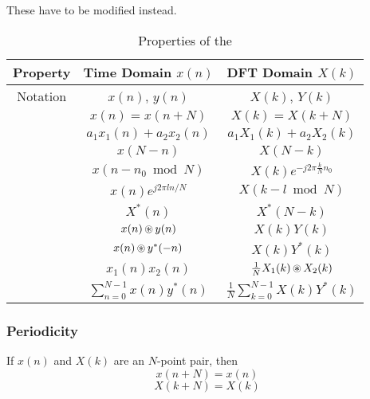 These have to be modified instead.
\begin{table}[h!]
  \centering
  \begin{tabular}{ccc}
    \toprule
    Property & Time Domain $x(n)$ & DFT Domain $X(k)$ \\
    \midrule
    Notation & $x(n)$, $y(n)$ & $X(k)$, $Y(k)$ \\
    \nameref{subsubsec:DFT_Properties-Periodicity} & $x(n) = x(n+N)$ & $X(k) = X(k+N)$ \\
    \nameref{subsubsec:DFT_Properties-Linearity} & $a_{1}x_{1}(n) + a_{2}x_{2}(n)$ & $a_{1}X_{1}(k) + a_{2}X_{2}(k)$ \\
    \nameref{subsubsec:DFT_Properties-Time_Reversal} & $x(N-n)$ & $X(N-k)$ \\
    \nameref{subsubsec:DFT_Properties-Circular_Time_Shifting} & $x(n - n_{0} \bmod N)$ & $X(k) e^{-j 2\pi \frac{k}{N} n_{0}} $ \\
    \nameref{subsubsec:DFT_Properties-Circular_Frequency_Shift} & $x(n)e^{j2\pi l n/N}$ & $X(k-l \bmod N)$ \\
    \nameref{subsubsec:DFT_Properties-Complex_Conjugate} & $X^{*}(n)$ & $X^{*}(N-k)$ \\
    \nameref{subsubsec:DFT_Properties-Circular_Convolution} & $x(n) \operatorname{\circledast} y(n)$ & $X(k)Y(k)$ \\
    \nameref{subsubsec:DFT_Properties-Circular_Correlation} & $x(n) \operatorname{\circledast} y^{*}(-n)$ & $X(k)Y^{*}(k)$ \\
    \nameref{subsubsec:DFT_Properties-2_Sequence_Multiplication} & $x_{1}(n)x_{2}(n)$ & $\frac{1}{N} X_{1}(k) \operatorname{\circledast} X_{2}(k)$ \\
    \nameref{subsubsec:DFT_Properties-Parsevals_Theorem} & $\sum\limits_{n=0}^{N-1} x(n) y^{*}(n)$ & $\frac{1}{N} \sum\limits_{k=0}^{N-1} X(k)Y^{*}(k)$ \\
    \bottomrule
  \end{tabular}
  \caption{Properties of the }
  \label{tab:DFT_Properties}
\end{table}

\subsubsection{Periodicity}\label{subsubsec:DFT_Properties-Periodicity}
If $x(n)$ and $X(k)$ are an $N$-point  pair, then
\begin{equation}\label{eq:DFT_Properties-Periodicity-Time}
  x(n+N) = x(n)
\end{equation}
\begin{equation}\label{eq:DFT_Properties-Periodicity-Frequency}
  X(k+N) = X(k)
\end{equation}

